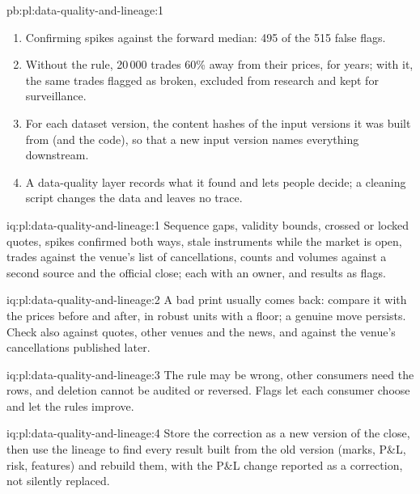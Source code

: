 \begin{solution}{pb:pl:data-quality-and-lineage:1}
\begin{enumerate}
realised variance 24\,000 times too large; with error rows excluded, the VWAPs are within 0.03\% and the variance is exact.
\item Confirming spikes against the forward median: 495 of the 515 false flags.
\item Without the rule, 20\,000 trades 60\% away from their prices, for years; with it, the same trades flagged as broken, excluded from
research and kept for surveillance.
\item For each dataset version, the content hashes of the input versions it was built from (and the code), so that a new input
version names everything downstream.
\item A data-quality layer records what it found and lets people decide; a cleaning script changes the data and leaves no trace.
\end{enumerate}
\end{solution}

\begin{solution}{iq:pl:data-quality-and-lineage:1}
Sequence gaps, validity bounds, crossed or locked quotes, spikes confirmed both ways, stale instruments while the market is open,
trades against the venue's list of cancellations, counts and volumes against a second source and the official close; each with an
owner, and results as flags.
\end{solution}

\begin{solution}{iq:pl:data-quality-and-lineage:2}
A bad print usually comes back: compare it with the prices before and after, in robust units with a floor; a genuine move persists.
Check also against quotes, other venues and the news, and against the venue's cancellations published later.
\end{solution}

\begin{solution}{iq:pl:data-quality-and-lineage:3}
The rule may be wrong, other consumers need the rows, and deletion cannot be audited or reversed. Flags let each consumer choose and
let the rules improve.
\end{solution}

\begin{solution}{iq:pl:data-quality-and-lineage:4}
Store the correction as a new version of the close, then use the lineage to find every result built from the old version (marks, P\&L,
risk, features) and rebuild them, with the P\&L change reported as a correction, not silently replaced.
\end{solution}

